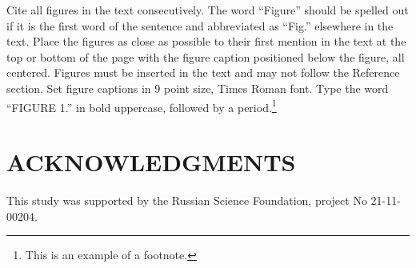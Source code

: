 \documentclass{aip-cp}
\begin{document}
Cite all figures in the text consecutively. The word ``Figure'' should be spelled out if it is the first word of the sentence and abbreviated as ``Fig.'' elsewhere in the text. Place the figures as close as possible to their first mention in the text at the top or bottom of the page with the figure caption positioned below the figure, all centered. Figures must be inserted in the text and may not follow the Reference section. Set figure captions in 9 point size, Times Roman font. Type the word ``FIGURE 1.'' in bold uppercase, followed by a period.\footnote{This is an example of a footnote.}

\section{ACKNOWLEDGMENTS}
This study was supported by the Russian Science Foundation, project No 21-11-00204.

\cite{Strongin2000,Kalyulin2017,Evtushenko2013,Jones2009,Zilinskas2010,Pinter1996,globalizerSystem,Barkalov2010,Strongin2020}




%
%
\end{document}

